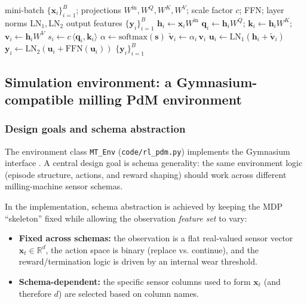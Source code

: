 \documentclass[sn-basic]{sn-jnl} %
\begin{document}
\begin{algorithm}[t]
\caption{Self-attention feature extractor (forward pass; batch-normalized gating)}
\label{alg:sa_forward}
\begin{algorithmic}[1]
\Require mini-batch $\{\mathbf{x}_i\}_{i=1}^{B}$; projections $W^{\mathrm{in}},W^Q,W^K,W^V$; scale factor $c$; FFN; layer norms $\mathrm{LN}_1,\mathrm{LN}_2$
\Ensure output features $\{\mathbf{y}_i\}_{i=1}^{B}$
		\State $\mathbf{h}_i \gets \mathbf{x}_i W^{\mathrm{in}}$
		\State $\mathbf{q}_i \gets \mathbf{h}_i W^Q$; $\mathbf{k}_i \gets \mathbf{h}_i W^K$; $\mathbf{v}_i \gets \mathbf{h}_i W^V$
		\State $s_i \gets c\,\langle \mathbf{q}_i,\mathbf{k}_i\rangle$ 
\EndFor
\State $\alpha \gets \mathrm{softmax}(\mathbf{s})$ 
		\State $\tilde{\mathbf{v}}_i \gets \alpha_i\,\mathbf{v}_i$
		\State $\mathbf{u}_i \gets \mathrm{LN}_1(\mathbf{h}_i + \tilde{\mathbf{v}}_i)$
		\State $\mathbf{y}_i \gets \mathrm{LN}_2(\mathbf{u}_i + \mathrm{FFN}(\mathbf{u}_i))$
\EndFor
\State \Return $\{\mathbf{y}_i\}_{i=1}^{B}$
\end{algorithmic}
\end{algorithm}

\subsection{Simulation environment: a Gymnasium-compatible milling PdM environment}
\label{sec:env}
\subsubsection{Design goals and schema abstraction}
The environment class \texttt{MT\_Env} (\texttt{code/rl\_pdm.py}) implements the Gymnasium interface \cite{Foundation2023}. A central design goal is schema generality: the same environment logic (episode structure, actions, and reward shaping) should work across different milling-machine sensor schemas.

In the implementation, schema abstraction is achieved by keeping the MDP ``skeleton'' fixed while allowing the observation \emph{feature set} to vary:
\begin{itemize}
	\item \textbf{Fixed across schemas:} the observation is a flat real-valued sensor vector $\mathbf{x}_t\in\mathbb{R}^d$, the action space is binary (replace vs. continue), and the reward/termination logic is driven by an internal wear threshold.
	\item \textbf{Schema-dependent:} the specific sensor columns used to form $\mathbf{x}_t$ (and therefore $d$) are selected based on column names.
\end{itemize}
\end{document}
